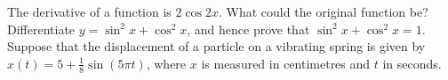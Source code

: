 \begin{questions}
  \questioA The derivative of a function is $ 2 \cos 2x $. What could the original function be?
  \questioM Differentiate $ y = \sin^2 x + \cos^2 x $, and hence prove that $ \sin^2 x + \cos^2 x = 1 $.
  \questioA Suppose that the displacement of a particle on a vibrating spring is given by $ x(t) =  5 + \frac{1}{8} \sin(5\pi t) $,
            where $ x $ is measured in centimetres and $ t $ in seconds.
\end{questions}
